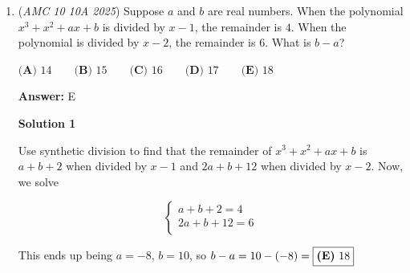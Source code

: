 \begin{enumerate}
 
            \begin{enumerate}[label=(\roman*)]
                \item $\|v_i-q_i\|=s\tan(\delta_i/2).$
            \end{enumerate}
            Indeed, $v_i-q_i$ is perpendicular to $n_i$, and the right triangle with vertices $0,q_i,v_i$ has adjacent leg $s$ and angle $\delta_i/2$ at the origin. Since $q_i$ lies between the endpoints $v_{i-1}$ and $v_i$ of its side,

 
            \begin{enumerate}[label=(\roman*)]
                \item $\|v_i-v_{i-1}\| =s\left(\tan\frac{\delta_{i-1}}2+\tan\frac{\delta_i}2\right) =\sin10^\circ\bigl(\tan20^\circ+\tan40^\circ\bigr).$
            \end{enumerate}
            Therefore all six side lengths are equal, although the interior angles alternate between two values. This further confirms the rotational structure encoded in $N$.

 The smallest interior angle, and hence the answer to the problem, is

 $\boxed{\textbf{(C) }100}$.

 Note: this strategy is bad for a time based competition due to how much time it takes ~King\_Dedede\_Math

 


	\item (\textit{AMC 10 10A 2025}) Suppose $a$ and $b$ are real numbers. When the polynomial $x^3+x^2+ax+b$ is divided by $x-1$, the remainder is $4$. When the polynomial is divided by $x-2$, the remainder is $6$. What is $b-a$?


 $\textbf{(A) } 14 \qquad\textbf{(B) } 15 \qquad\textbf{(C) } 16 \qquad\textbf{(D) } 17 \qquad\textbf{(E) } 18$

 \textbf{Answer: }E



\textbf{Solution 1}

Use synthetic division to find that the remainder of $x^{3}+x^{2}+ax+b$ is $a+b+2$ when divided by $x-1$ and $2a+b+12$ when divided by $x-2$. Now, we solve

 
 \[\begin{cases} a+b+2=4 \\ 2a+b+12 = 6 \\ \end{cases}\]

 This ends up being $a=-8$, $b=10$, so $b-a=10-(-8)=\fbox{\textbf{(E)} 18}$





\end{enumerate}
